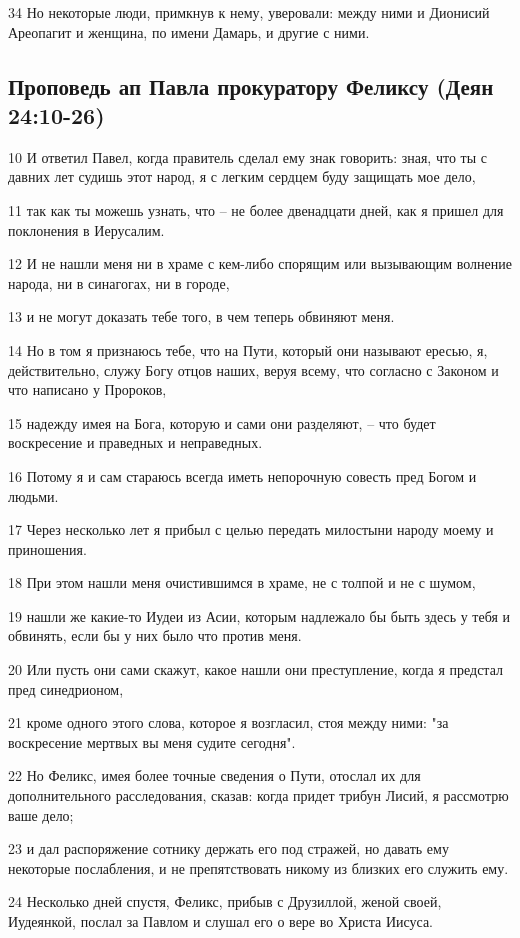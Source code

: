 34 Но некоторые люди, примкнув к нему, уверовали: между ними и Дионисий Ареопагит и женщина, по имени Дамарь, и другие с ними.

\subsection*{Проповедь ап Павла прокуратору Феликсу (Деян 24:10-26)}
10 И ответил Павел, когда правитель сделал ему знак говорить: зная, что ты с давних лет судишь этот народ, я с легким сердцем буду защищать мое дело,

11 так как ты можешь узнать, что – не более двенадцати дней, как я пришел для поклонения в Иерусалим.

12 И не нашли меня ни в храме с кем-либо спорящим или вызывающим волнение народа, ни в синагогах, ни в городе,

13 и не могут доказать тебе того, в чем теперь обвиняют меня.

14 Но в том я признаюсь тебе, что на Пути, который они называют ересью, я, действительно, служу Богу отцов наших, веруя всему, что согласно с Законом и что написано у Пророков,

15 надежду имея на Бога, которую и сами они разделяют, – что будет воскресение и праведных и неправедных.

16 Потому я и сам стараюсь всегда иметь непорочную совесть пред Богом и людьми.

17 Через несколько лет я прибыл с целью передать милостыни народу моему и приношения.

18 При этом нашли меня очистившимся в храме, не с толпой и не с шумом,

19 нашли же какие-то Иудеи из Асии, которым надлежало бы быть здесь у тебя и обвинять, если бы у них было что против меня.

20 Или пусть они сами скажут, какое нашли они преступление, когда я предстал пред синедрионом,

21 кроме одного этого слова, которое я возгласил, стоя между ними: "за воскресение мертвых вы меня судите сегодня".

22 Но Феликс, имея более точные сведения о Пути, отослал их для дополнительного расследования, сказав: когда придет трибун Лисий, я рассмотрю ваше дело;

23 и дал распоряжение сотнику держать его под стражей, но давать ему некоторые послабления, и не препятствовать никому из близких его служить ему.

24 Несколько дней спустя, Феликс, прибыв с Друзиллой, женой своей, Иудеянкой, послал за Павлом и слушал его о вере во Христа Иисуса.

